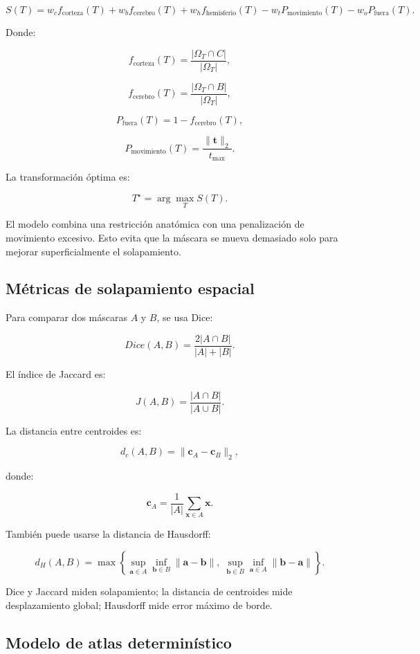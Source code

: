 \documentclass[12pt,a4paper]{article}
\begin{document}
\[
S(T)
=
w_c f_{\text{corteza}}(T)
+
w_b f_{\text{cerebro}}(T)
+
w_h f_{\text{hemisferio}}(T)
-
w_t P_{\text{movimiento}}(T)
-
w_o P_{\text{fuera}}(T).
\]

Donde:

\[
f_{\text{corteza}}(T)
=
\frac{|\Omega_T\cap C|}{|\Omega_T|},
\]

\[
f_{\text{cerebro}}(T)
=
\frac{|\Omega_T\cap B|}{|\Omega_T|},
\]

\[
P_{\text{fuera}}(T)
=
1-
f_{\text{cerebro}}(T),
\]

\[
P_{\text{movimiento}}(T)
=
\frac{\|\mathbf{t}\|_2}{t_{\max}}.
\]

La transformación óptima es:

\[
T^\star =
\arg\max_T S(T).
\]

El modelo combina una restricción anatómica con una penalización de movimiento excesivo. Esto evita que la máscara se mueva demasiado solo para mejorar superficialmente el solapamiento.

\subsection{Métricas de solapamiento espacial}

Para comparar dos máscaras \(A\) y \(B\), se usa Dice:

\[
Dice(A,B)
=
\frac{2|A\cap B|}
{|A|+|B|}.
\]

El índice de Jaccard es:

\[
J(A,B)
=
\frac{|A\cap B|}
{|A\cup B|}.
\]

La distancia entre centroides es:

\[
d_c(A,B)
=
\|\mathbf{c}_A-\mathbf{c}_B\|_2,
\]

donde:

\[
\mathbf{c}_A=
\frac{1}{|A|}
\sum_{\mathbf{x}\in A}
\mathbf{x}.
\]

También puede usarse la distancia de Hausdorff:

\[
d_H(A,B)
=
\max
\left\{
\sup_{\mathbf{a}\in A}\inf_{\mathbf{b}\in B}
\|\mathbf{a}-\mathbf{b}\|,
\;
\sup_{\mathbf{b}\in B}\inf_{\mathbf{a}\in A}
\|\mathbf{b}-\mathbf{a}\|
\right\}.
\]

Dice y Jaccard miden solapamiento; la distancia de centroides mide desplazamiento global; Hausdorff mide error máximo de borde.

\subsection{Modelo de atlas determinístico}
\end{document}
